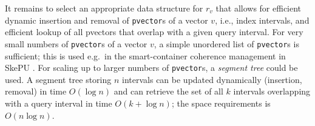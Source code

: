 \documentclass[preprint,12pt]{elsarticle}
\newcommand{\TODO}[1]{\textcolor{red}{\textbf{[TODO:#1]}}}
\begin{document}

It remains to select an appropriate data structure for $r_v$ that allows for
efficient dynamic insertion and removal of \texttt{pvector}s of a vector $v$, 
i.e., index intervals, and efficient lookup of all pvectors that overlap
with a given query interval.
For very small numbers of \texttt{pvector}s of a vector $v$, a simple unordered
list of \texttt{pvector}s is sufficient; this is used e.g.\ in the
smart-container coherence management in SkePU \cite{Dastgeer-IJPP15}. 
For scaling up to larger numbers of \texttt{pvector}s,
a \emph{segment tree} \cite[Sec.~10.3]{Overmars} %
could be used. A segment tree storing $n$ intervals
can be updated dynamically (insertion, removal) in time  $O(\log n)$ and
can retrieve the set of all $k$ intervals overlapping with a query interval
in time $O(k+\log n)$; the space requirements is $O(n\log n)$.

%
%
\end{document}
